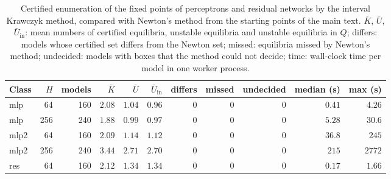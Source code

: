 \documentclass[aip,cha,preprint,amsmath,amssymb,longbibliography]{revtex4-2}
\begin{document}
\begin{table}
\caption{Certified enumeration of the fixed points of perceptrons and residual networks by the interval Krawczyk method,
compared with Newton's method from the starting points of the main text. $\bar K$, $\bar U$, $\bar U_{\mathrm{in}}$: mean
numbers of certified equilibria, unstable equilibria and unstable equilibria in $Q$; differs: models whose certified set
differs from the Newton set; missed: equilibria missed by Newton's method; undecided: models with boxes that the method
could not decide; time: wall-clock time per model in one worker process.}
\label{tab:sm_cert}
\begin{ruledtabular}
\begin{tabular}{lrrrrrrrrrr}
Class & $H$ & models & $\bar K$ & $\bar U$ & $\bar U_{\mathrm{in}}$ & differs & missed & undecided & median (s) & max (s) \\
\hline
mlp & 64 & 160 & $2.08$ & $1.04$ & $0.96$ & 0 & 0 & 0 & $0.41$ & $4.26$ \\
mlp & 256 & 240 & $1.88$ & $0.99$ & $0.97$ & 0 & 0 & 0 & $5.28$ & $30.6$ \\
mlp2 & 64 & 160 & $2.09$ & $1.14$ & $1.12$ & 0 & 0 & 0 & $36.8$ & $245$ \\
mlp2 & 256 & 240 & $3.44$ & $2.71$ & $2.70$ & 0 & 0 & 0 & $215$ & $2772$ \\
res\footnotemark[1] & 64 & 160 & $2.12$ & $1.34$ & $1.34$ & 0 & 0 & 0 & $0.17$ & $1.66$ \\
\end{tabular}
\end{ruledtabular}
\end{table}



\end{document}
